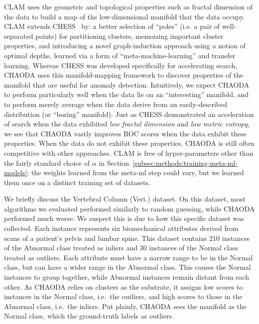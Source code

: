 CLAM uses the geometric and topological properties such as fractal dimension of the data to build a map of the low-dimensional manifold that the data occupy.
CLAM extends CHESS~\cite{ishaq2019clustered} by:
a better selection of ``poles'' (i.e. a pair of well-separated points) for partitioning clusters,
memoizing important cluster properties, and
introducing a novel graph-induction approach using a notion of optimal depths, learned via a form of ``meta-machine-learning'' and transfer learning.
Whereas CHESS was developed specifically for accelerating search,
CHAODA uses this manifold-mapping framework to discover properties of the manifold that are useful for anomaly detection.
Intuitively, we expect CHAODA to perform particularly well when the data lie on an ``interesting'' manifold, and to perform merely average when the data derive from an easily-described distribution (or ``boring'' manifold).
Just as CHESS demonstrated an acceleration of search when the data exhibited \emph{low fractal dimension} and \emph{low metric entropy}, we see that CHAODA vastly improves ROC scores when the data exhibit these properties.
When the data do not exhibit these properties, CHAODA is still often competitive with other approaches.
CLAM is free of hyper-parameters other than the fairly standard choice of $\alpha$ in Section~\ref{subsec:methods:training-meta-ml-models}; the weights learned from the meta-ml step could vary, but we learned them once on a distinct training set of datasets.

We briefly discuss the Vertebral Column (Vert.) dataset.
On this dataset, most algorithms we evaluated performed similarly to random guessing, while CHAODA performed much worse.
We suspect this is due to how this specific dataset was collected.
Each instance represents six biomechanical attributes derived from scans of a patient's pelvis and lumbar spine.
This dataset contains 210 instances of the Abnormal class treated as inliers and 30 instances of the Normal class treated as outliers.
Each attribute must have a narrow range to be in the Normal class, but can have a wider range in the Abnormal class.
This causes the Normal instances to group together, while Abnormal instances remain distant from each other.
As CHAODA relies on clusters as the substrate, it assigns low scores to instances in the Normal class, i.e.\ the outliers, and high scores to those in the Abnormal class, i.e.\ the inliers.
Put plainly, CHAODA sees the manifold as the Normal class, which the ground-truth labels as outliers.

